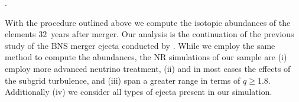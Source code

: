 





.




With the procedure outlined above we compute the isotopic abundances of 
the \rproc{} elements $32$~years after merger. 
Our analysis is the continuation of the previous study of the \ac{BNS} merger ejecta 
\nuc{} conducted by \citet{Radice:2018pdn}. While we employ the same method
to compute the abundances, the \ac{NR} simulations of our sample are 
(i) employ more advanced neutrino treatment, 
%
(ii) and in most cases the effects of the subgrid turbulence, 
and (iii) span a greater range in terms of \mr{} $q\geq1.8$. 
Additionally (iv) we consider all types of ejecta present in our simulation.



